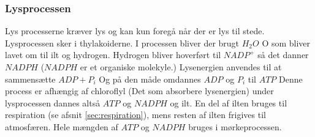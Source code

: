             \subsubsection{Lysprocessen}
                Lys processerne kræver lys og kan kun foregå når der er lys til stede. Lysprocessen sker i thylakoiderne. I processen bliver der brugt \begin{math}H_2O\end{math} O som bliver lavet om til ilt og hydrogen. Hydrogen bliver hoverført til \begin{math}NADP^+\end{math} så det danner \begin{math}NADPH\end{math} (\begin{math}NADPH\end{math} er et organiske molekyle.) 
                Lysenergien anvendes til at sammensætte \begin{math}ADP + P_i\end{math} Og på den måde omdannes \begin{math}ADP\end{math} og \begin{math}P_i\end{math} til \begin{math}ATP\end{math} Denne process er afhængig af chloroflyl (Det som absorbere lysenergien) under lysprocessen dannes altså \begin{math}ATP\end{math} og \begin{math}NADPH\end{math} og ilt. En del af ilten bruges til respiration (se afsnit \ref{sec:respiration}), mens resten af ilten frigives til atmosfæren. Hele mængden af \begin{math}ATP\end{math} og \begin{math}NADPH\end{math} bruges i mørkeprocessen. 

